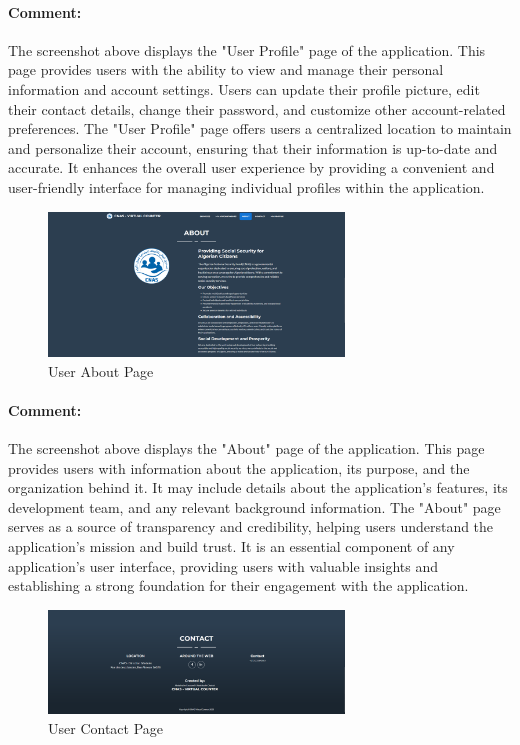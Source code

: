 \begin{itemize}
\paragraph{Comment:} The screenshot above displays the "User Profile" page of the application. This page provides users with the ability to view and manage their personal information and account settings. Users can update their profile picture, edit their contact details, change their password, and customize other account-related preferences. The "User Profile" page offers users a centralized location to maintain and personalize their account, ensuring that their information is up-to-date and accurate. It enhances the overall user experience by providing a convenient and user-friendly interface for managing individual profiles within the application.

\begin{figure}[htbp]
    \centering
    \includegraphics[width=0.7\textwidth]{SCREENSHOTS/user/about.png}
    \caption{User About Page}
    \label{fig:user-about}
\end{figure}
\paragraph{Comment:} The screenshot above displays the "About" page of the application. This page provides users with information about the application, its purpose, and the organization behind it. It may include details about the application's features, its development team, and any relevant background information. The "About" page serves as a source of transparency and credibility, helping users understand the application's mission and build trust. It is an essential component of any application's user interface, providing users with valuable insights and establishing a strong foundation for their engagement with the application.
\begin{figure}[htbp]
    \centering
    \includegraphics[width=0.7\textwidth]{SCREENSHOTS/user/contact.png}
    \caption{User Contact Page}
    \label{fig:user-contact}
\end{figure}

\end{itemize}
